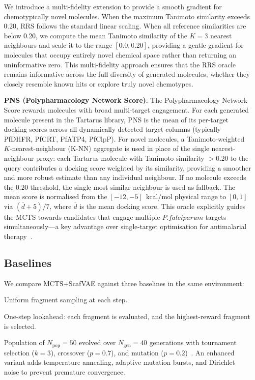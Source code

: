 \documentclass[jcim,article,layout=manuscript]{achemso}
\begin{document}
We introduce a multi-fidelity extension to provide a smooth gradient for
chemotypically novel molecules. When the maximum Tanimoto similarity
exceeds 0.20, RRS follows the standard linear scaling. When all reference
similarities are below 0.20, we compute the mean Tanimoto similarity of
the $K=3$ nearest neighbours and scale it to the range $[0.0, 0.20]$,
providing a gentle gradient for molecules that occupy entirely novel
chemical space rather than returning an uninformative zero. This
multi-fidelity approach ensures that the RRS oracle remains informative
across the full diversity of generated molecules, whether they closely
resemble known hits or explore truly novel chemotypes.

\textbf{PNS (Polypharmacology Network Score).} The Polypharmacology
Network Score rewards molecules with broad multi-target engagement.
For each generated molecule present in the Tartarus library, PNS is the
mean of its per-target docking scores across all dynamically detected
target columns (typically PfDHFR, PfCRT, PfATP4, PfClpP). For novel
molecules, a Tanimoto-weighted $K$-nearest-neighbour (K-NN) aggregate
is used in place of the single nearest-neighbour proxy: each Tartarus
molecule with Tanimoto similarity $>0.20$ to the query contributes a
docking score weighted by its similarity, providing a smoother and more
robust estimate than any individual neighbour. If no molecule exceeds the
0.20 threshold, the single most similar neighbour is used as fallback.
The mean score is normalised from the $[-12,-5]$~kcal/mol physical range
to $[0,1]$ via $(\bar{d} + 5)/7$, where $\bar{d}$ is the mean docking
score. This oracle explicitly guides the MCTS towards candidates that
engage multiple $P. falciparum$ targets simultaneously---a key advantage
over single-target optimisation for antimalarial
 therapy~\cite{Burrows2017}.

\subsection{Baselines}
\label{sec:baselines}

We compare MCTS+ScafVAE against three baselines in the same environment:
\begin{description}[itemsep=0pt]
  \item[Random search.] Uniform fragment sampling at each step.
  \item[Greedy search.] One-step lookahead: each fragment is evaluated,
    and the highest-reward fragment is selected.
  \item[Genetic algorithm (GA).] Population of $N_\text{pop}=50$ evolved
    over $N_\text{gen}=40$ generations with tournament selection ($k=3$),
    crossover ($p=0.7$), and mutation ($p=0.2$)~\cite{Jensen2019}. An
    enhanced variant adds temperature annealing, adaptive mutation bursts,
    and Dirichlet noise to prevent premature convergence.
\end{description}
\end{document}
